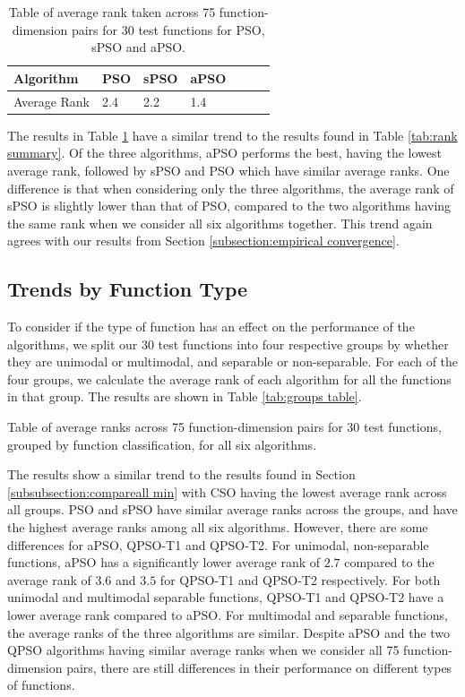 \documentclass[12pt]{article}
\theoremstyle{definition}
\begin{document}
\begin{table}[H]
    \centering
    \begin{tabular}{|l|l|l|l|l|l|l|}
    \toprule
    Algorithm & PSO & sPSO & aPSO \\ \midrule
    Average Rank & 2.4 & 2.2 & 1.4 \\
    \bottomrule
    \end{tabular}
    \caption{Table of average rank taken across 75 function-dimension pairs for 30 test functions for PSO, sPSO and aPSO.}
    \label{tab:rank small summary}
\end{table}

The results in Table \ref{tab:rank small summary} have a similar trend to the results found in Table \ref{tab:rank summary}. Of the three algorithms, aPSO performs the best, having the lowest average rank, followed by sPSO and PSO which have similar average ranks. One difference is that when considering only the three algorithms, the average rank of sPSO is slightly lower than that of PSO, compared to the two algorithms having the same rank when we consider all six algorithms together. This trend again agrees with our results from Section \ref{subsection:empirical convergence}.

\subsection{Trends by Function Type}
To consider if the type of function has an effect on the performance of the algorithms, we split our 30 test functions into four respective groups by whether they are unimodal or multimodal, and separable or non-separable. For each of the four groups, we calculate the average rank of each algorithm for all the functions in that group. The results are shown in Table \ref{tab:groups table}. \newline

\begin{table}[H]
    \centering
    \resizebox{\textwidth}{!}{
        
    }
    \caption{Table of average ranks across 75 function-dimension pairs for 30 test functions, grouped by function classification, for all six algorithms.}
    \label{tab:groups table}
\end{table}

The results show a similar trend to the results found in Section \ref{subsubsection:compareall min} with CSO having the lowest average rank across all groups. PSO and sPSO have similar average ranks across the groups, and have the highest average ranks among all six algorithms. However, there are some differences for aPSO, QPSO-T1 and QPSO-T2. For unimodal, non-separable functions, aPSO has a significantly lower average rank of $2.7$ compared to the average rank of $3.6$ and $3.5$ for QPSO-T1 and QPSO-T2 respectively. For both unimodal and multimodal separable functions, QPSO-T1 and QPSO-T2 have a lower average rank compared to aPSO. For multimodal and separable functions, the average ranks of the three algorithms are similar. Despite aPSO and the two QPSO algorithms having similar average ranks when we consider all 75 function-dimension pairs, there are still differences in their performance on different types of functions.
\end{document}
